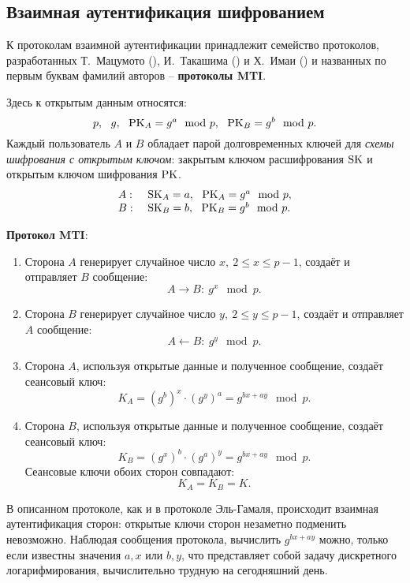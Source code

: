 \subsection{Взаимная аутентификация шифрованием}

К протоколам взаимной аутентификации принадлежит семейство протоколов, разработанных Т.~Мацумото (), И.~Такашима () и Х.~Имаи () и названных по первым буквам фамилий авторов -- \textbf{протоколы MTI}.

Здесь к открытым данным относятся:
    \[ p, ~~ g, ~~ \textrm{PK}_A = g^a \mod p, ~~ \textrm{PK}_B = g^b \mod p. \]
Каждый пользователь $A$ и $B$ обладает парой долговременных ключей для \emph{схемы шифрования с открытым ключом}: закрытым ключом расшифрования $\textrm{SK}$ и открытым ключом шифрования $\textrm{PK}$.
\[ \begin{array}{ll}
    A: & ~ \textrm{SK}_A = a, ~~ \textrm{PK}_A = g^a \mod p, \\
    B: & ~ \textrm{SK}_B = b, ~~ \textrm{PK}_B = g^b \mod p. \\
\end{array} \]

\textbf{Протокол MTI}:
\begin{enumerate}
    \item Сторона $A$ генерирует случайное число $x, ~ 2\leq x\leq p-1$, создаёт и отправляет $B$ сообщение:
        \[ A \rightarrow B: ~ g^x \mod p. \]
    \item Сторона $B$ генерирует случайное число $y, ~ 2\leq y\leq p-1$, создаёт и отправляет $A$ сообщение:
        \[ A \leftarrow B: ~ g^y \mod p. \]
    \item Сторона $A$, используя открытые данные и полученное сообщение, создаёт сеансовый ключ:
        \[ K_A = (g^b)^x \cdot (g^y)^a = g^{bx+ay} \mod p. \]
    \item Сторона $B$, используя открытые данные и полученное сообщение, создаёт сеансовый ключ:
        \[ K_B = (g^x)^b \cdot (g^a)^y = g^{bx+ay} \mod p. \]
        Сеансовые ключи обоих сторон совпадают:
        \[ K_{A} =K_{B} = K. \]
\end{enumerate}

В описанном протоколе, как и в протоколе Эль-Гамаля, происходит взаимная аутентификация сторон: открытые ключи сторон незаметно подменить невозможно. Наблюдая сообщения протокола, вычислить $g^{bx+ay}$ можно, только если известны значения $a,x$ или $b,y$, что представляет собой задачу дискретного логарифмирования, вычислительно трудную на сегодняшний день.
